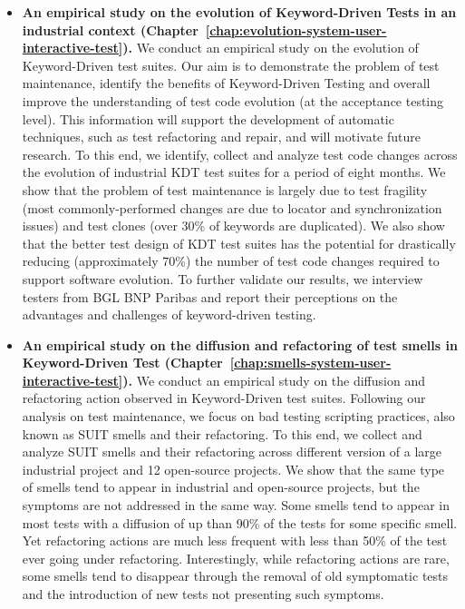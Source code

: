 \begin{itemize}
    \item \textbf{An empirical study on the evolution of Keyword-Driven Tests in an industrial context (Chapter~\ref{chap:evolution-system-user-interactive-test}).} We conduct an empirical study on the evolution of Keyword-Driven test suites. Our aim is to demonstrate the problem of test maintenance, identify the benefits of Keyword-Driven Testing and overall improve the understanding of test code evolution (at the acceptance testing level). This information will support the development of automatic techniques, such as test refactoring and repair, and will motivate future research. To this end, we identify, collect and analyze test code changes across the evolution of industrial KDT test suites for a period of eight months. We show that the problem of test maintenance is largely due to test fragility (most commonly-performed changes are due to locator and synchronization issues) and test clones (over 30\% of keywords are duplicated). We also show that the better test design of KDT test suites has the potential for drastically reducing (approximately 70\%) the number of test code changes required to support software evolution. To further validate our results, we interview testers from BGL BNP Paribas and report their perceptions on the advantages and challenges of keyword-driven testing. 
    
    \item \textbf{An empirical study on the diffusion and refactoring of test smells in Keyword-Driven Test (Chapter~\ref{chap:smells-system-user-interactive-test}).} We conduct an empirical study on the diffusion and refactoring action observed in Keyword-Driven test suites. Following our analysis on test maintenance, we focus on bad testing scripting practices, also known as SUIT smells and their refactoring. To this end, we collect and analyze SUIT smells and their refactoring across different version of a large industrial project and 12 open-source projects. We show that the same type of smells tend to appear in industrial and open-source projects, but the symptoms are not addressed in the same way. Some smells tend to appear in most tests with a diffusion of up than 90\% of the tests for some specific smell. Yet refactoring actions are much less frequent with less than 50\% of the test ever going under refactoring. Interestingly,  while refactoring actions are rare, some smells tend to disappear through the removal of old symptomatic tests and the introduction of new tests not presenting such symptoms.
    

\end{itemize}
